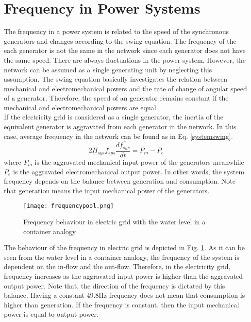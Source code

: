 \section{Frequency in Power Systems}
The frequency in a power system is related to the speed of the synchronous generators and changes according to the swing equation. The frequency of the each generator is not the same in the network since each generator does not have the same speed. There are always fluctuations in the power system. However, the network can be assumed as a single generating unit by neglecting this assumption. The swing equation basically investigates the relation between mechanical and electromechanical powers and the rate of change of angular speed of a generator. Therefore, the speed of an generator remains constant if the mechanical and electromechanical powers are equal.\\
If the electricity grid is considered as a single generator, the inertia of the equivalent generator is aggravated from each generator in the network. In this case, average frequency in the network can be found as in Eq. \ref{systemswing}. 
\begin{equation}
\label{systemswing}
2H_{sys}\overline{f_{sys}}\frac{d\overline{f_{sys}}}{dt}=\overline{P_{m}}-\overline{P_{e}}
\end{equation}
where $P_{m}$ is the aggravated mechanical input power of the generators meanwhile $P_{e}$ is the aggravated electromechanical output power. In other words, the system frequency depends on the balance between generation and consumption. Note that generation means the input mechanical power of the generators.
\begin{figure}[h!]
	\centering
	\texttt{[image: frequencypool.png]}
	\caption{Frequency behaviour in electric grid with the water level in a container analogy \cite{Eto2010}}
	\label{frequencyingrid}
\end{figure}
The behaviour of the frequency in electric grid is depicted in Fig. \ref{frequencyingrid}. As it can be seen from the water level in a container analogy, the frequency of the system is dependent on the in-flow and the out-flow. Therefore, in the electricity grid, frequency increases as the aggravated input power is higher than the aggravated output power. Note that, the direction of the frequency is dictated by this balance. Having a constant 49.8Hz frequency does not mean that consumption is higher than generation. If the frequency is constant, then the input mechanical power is equal to output power.
